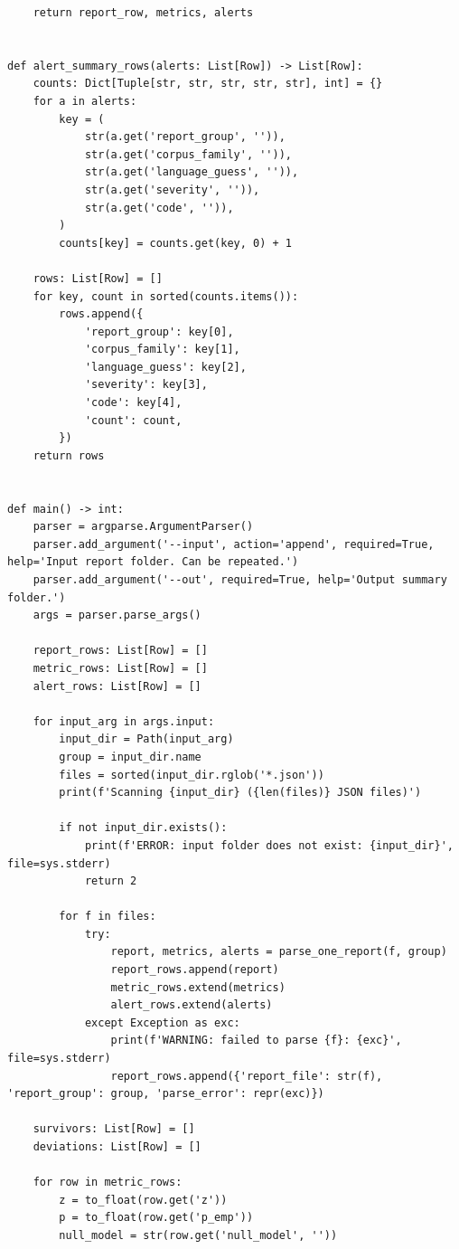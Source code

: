 \documentclass[11pt,a4paper]{article}
\begin{document}
\begin{lstlisting}
    return report_row, metrics, alerts


def alert_summary_rows(alerts: List[Row]) -> List[Row]:
    counts: Dict[Tuple[str, str, str, str, str], int] = {}
    for a in alerts:
        key = (
            str(a.get('report_group', '')),
            str(a.get('corpus_family', '')),
            str(a.get('language_guess', '')),
            str(a.get('severity', '')),
            str(a.get('code', '')),
        )
        counts[key] = counts.get(key, 0) + 1

    rows: List[Row] = []
    for key, count in sorted(counts.items()):
        rows.append({
            'report_group': key[0],
            'corpus_family': key[1],
            'language_guess': key[2],
            'severity': key[3],
            'code': key[4],
            'count': count,
        })
    return rows


def main() -> int:
    parser = argparse.ArgumentParser()
    parser.add_argument('--input', action='append', required=True, help='Input report folder. Can be repeated.')
    parser.add_argument('--out', required=True, help='Output summary folder.')
    args = parser.parse_args()

    report_rows: List[Row] = []
    metric_rows: List[Row] = []
    alert_rows: List[Row] = []

    for input_arg in args.input:
        input_dir = Path(input_arg)
        group = input_dir.name
        files = sorted(input_dir.rglob('*.json'))
        print(f'Scanning {input_dir} ({len(files)} JSON files)')

        if not input_dir.exists():
            print(f'ERROR: input folder does not exist: {input_dir}', file=sys.stderr)
            return 2

        for f in files:
            try:
                report, metrics, alerts = parse_one_report(f, group)
                report_rows.append(report)
                metric_rows.extend(metrics)
                alert_rows.extend(alerts)
            except Exception as exc:
                print(f'WARNING: failed to parse {f}: {exc}', file=sys.stderr)
                report_rows.append({'report_file': str(f), 'report_group': group, 'parse_error': repr(exc)})

    survivors: List[Row] = []
    deviations: List[Row] = []

    for row in metric_rows:
        z = to_float(row.get('z'))
        p = to_float(row.get('p_emp'))
        null_model = str(row.get('null_model', ''))


\end{lstlisting}
\end{document}
